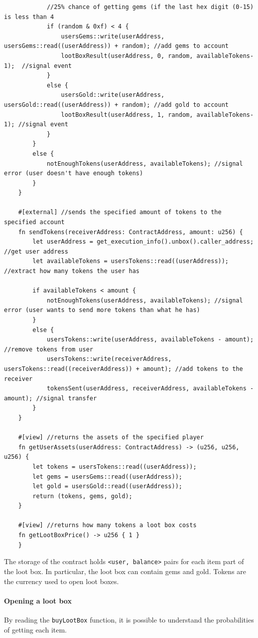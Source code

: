 \documentclass[12pt]{article}
\begin{document}
\begin{lstlisting}
            //25% chance of getting gems (if the last hex digit (0-15) is less than 4
            if (random & 0xf) < 4 {
                usersGems::write(userAddress, usersGems::read((userAddress)) + random); //add gems to account
                lootBoxResult(userAddress, 0, random, availableTokens-1);  //signal event
            }
            else {
                usersGold::write(userAddress, usersGold::read((userAddress)) + random); //add gold to account
                lootBoxResult(userAddress, 1, random, availableTokens-1); //signal event
            }
        }
        else {
            notEnoughTokens(userAddress, availableTokens); //signal error (user doesn't have enough tokens)
        }
    }

    #[external] //sends the specified amount of tokens to the specified account
    fn sendTokens(receiverAddress: ContractAddress, amount: u256) {
        let userAddress = get_execution_info().unbox().caller_address; //get user address
        let availableTokens = usersTokens::read((userAddress)); //extract how many tokens the user has
        
        if availableTokens < amount {
            notEnoughTokens(userAddress, availableTokens); //signal error (user wants to send more tokens than what he has)
        }
        else {
            usersTokens::write(userAddress, availableTokens - amount); //remove tokens from user
            usersTokens::write(receiverAddress, usersTokens::read((receiverAddress)) + amount); //add tokens to the receiver
            tokensSent(userAddress, receiverAddress, availableTokens - amount); //signal transfer
        }
    }

    #[view] //returns the assets of the specified player
    fn getUserAssets(userAddress: ContractAddress) -> (u256, u256, u256) {
        let tokens = usersTokens::read((userAddress));
        let gems = usersGems::read((userAddress));
        let gold = usersGold::read((userAddress));
        return (tokens, gems, gold);
    }

    #[view] //returns how many tokens a loot box costs
    fn getLootBoxPrice() -> u256 { 1 }
    }
\end{lstlisting}

The storage of the contract holds \verb|<user, balance>| pairs for each item part of the loot box. In particular, the loot box can contain gems and gold. Tokens are the currency used to open loot boxes.

\paragraph{Opening a loot box}
By reading the \verb|buyLootBox| function, it is possible to understand the probabilities of getting each item. 
\end{document}
